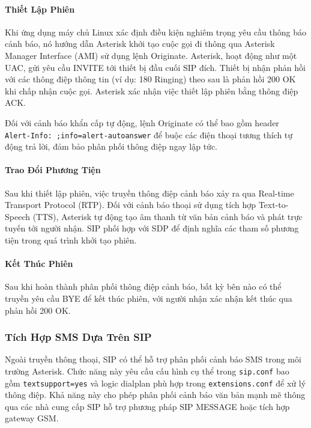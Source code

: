 \paragraph{Thiết Lập Phiên}
Khi ứng dụng máy chủ Linux xác định điều kiện nghiêm trọng yêu cầu thông báo cảnh báo, nó hướng dẫn Asterisk khởi tạo cuộc gọi đi thông qua Asterisk Manager Interface (AMI) sử dụng lệnh Originate. Asterisk, hoạt động như một UAC, gửi yêu cầu INVITE tới thiết bị đầu cuối SIP đích. Thiết bị nhận phản hồi với các thông điệp thông tin (ví dụ: 180 Ringing) theo sau là phản hồi 200 OK khi chấp nhận cuộc gọi. Asterisk xác nhận việc thiết lập phiên bằng thông điệp ACK.

Đối với cảnh báo khẩn cấp tự động, lệnh Originate có thể bao gồm header \texttt{Alert-Info: ;info=alert-autoanswer} để buộc các điện thoại tương thích tự động trả lời, đảm bảo phân phối thông điệp ngay lập tức.

\paragraph{Trao Đổi Phương Tiện}
Sau khi thiết lập phiên, việc truyền thông điệp cảnh báo xảy ra qua Real-time Transport Protocol (RTP). Đối với cảnh báo thoại sử dụng tích hợp Text-to-Speech (TTS), Asterisk tự động tạo âm thanh từ văn bản cảnh báo và phát trực tuyến tới người nhận. SIP phối hợp với SDP để định nghĩa các tham số phương tiện trong quá trình khởi tạo phiên.

\paragraph{Kết Thúc Phiên}
Sau khi hoàn thành phân phối thông điệp cảnh báo, bất kỳ bên nào có thể truyền yêu cầu BYE để kết thúc phiên, với người nhận xác nhận kết thúc qua phản hồi 200 OK.

\subsubsection{Tích Hợp SMS Dựa Trên SIP}
\label{subsubsec:sip_sms}

Ngoài truyền thông thoại, SIP có thể hỗ trợ phân phối cảnh báo SMS trong môi trường Asterisk. Chức năng này yêu cầu cấu hình cụ thể trong \texttt{sip.conf} bao gồm \texttt{textsupport=yes} và logic dialplan phù hợp trong \texttt{extensions.conf} để xử lý thông điệp. Khả năng này cho phép phân phối cảnh báo văn bản mạnh mẽ thông qua các nhà cung cấp SIP hỗ trợ phương pháp SIP MESSAGE hoặc tích hợp gateway GSM.

